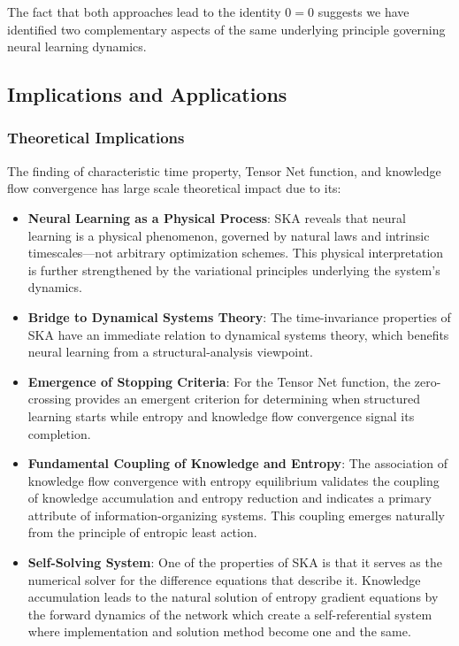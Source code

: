 \documentclass{article}
\begin{document}
The fact that both approaches lead to the identity $0 = 0$ suggests we have identified two complementary aspects of the same underlying principle governing neural learning dynamics.

	
	\subsection{Implications and Applications}
	
	\subsubsection{Theoretical Implications}
	The finding of characteristic time property, Tensor Net function, and knowledge flow convergence has large scale theoretical impact due to its:

    \begin{itemize}
		
		\item \textbf{Neural Learning as a Physical Process}: SKA reveals that neural learning is a physical phenomenon, governed by natural laws and intrinsic timescales—not arbitrary optimization schemes. This physical interpretation is further strengthened by the variational principles underlying the system's dynamics.
		
		\item \textbf{Bridge to Dynamical Systems Theory}: The time-invariance properties of SKA have an immediate relation to dynamical systems theory, which benefits neural learning from a structural-analysis viewpoint.

        \item \textbf{Emergence of Stopping Criteria}: For the Tensor Net function, the zero-crossing provides an emergent criterion for determining when structured learning starts while entropy and knowledge flow convergence signal its completion.
		
		\item \textbf{Fundamental Coupling of Knowledge and Entropy}: The association of knowledge flow convergence with entropy equilibrium validates the coupling of knowledge accumulation and entropy reduction and indicates a primary attribute of information-organizing systems. This coupling emerges naturally from the principle of entropic least action.

        \item \textbf{Self-Solving System}: One of the properties of SKA is that it serves as the numerical solver for the difference equations that describe it. Knowledge accumulation leads to the natural solution of entropy gradient equations by the forward dynamics of the network which create a self-referential system where implementation and solution method become one and the same.
	\end{itemize}
\end{document}
